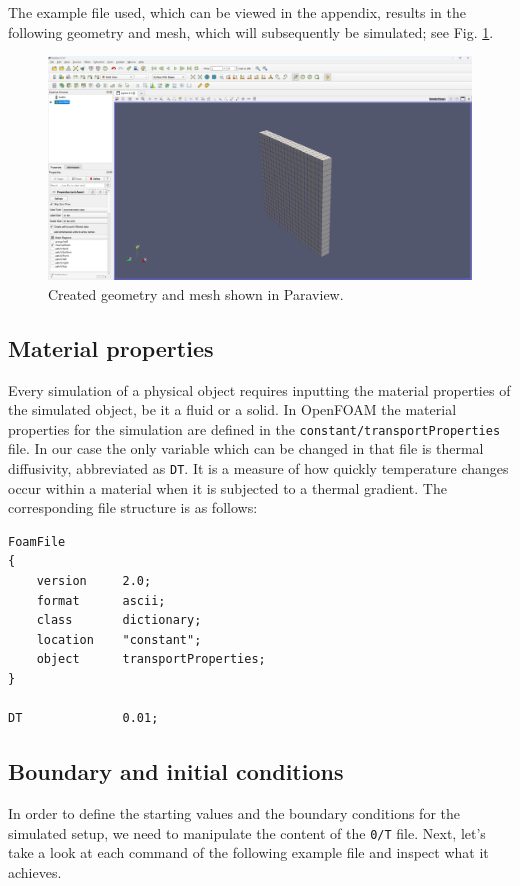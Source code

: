 \documentclass{article}
\begin{document}
\noindent The example file used, which can be viewed in the appendix, results in the following geometry and mesh, which will subsequently be simulated; see Fig. \ref{fig:UsedMesh}.

\begin{figure} [H]
    \centering
    \includegraphics[width= 15cm]{Example_geometry.png}
    \caption{Created geometry and mesh shown in Paraview.}
    \label{fig:UsedMesh}
\end{figure}

\subsection{Material properties}
Every simulation of a physical object requires inputting the material properties of the simulated object, be it a fluid or a solid. In OpenFOAM the material properties for the simulation are defined in the \texttt{constant/transportProperties} file. In our case the only variable which can be changed in that file is thermal diffusivity, abbreviated as \texttt{DT}. It is a measure of how quickly temperature changes occur within a material when it is subjected to a thermal gradient. The corresponding file structure is as follows:

\begin{verbatim}
FoamFile
{
    version     2.0;
    format      ascii;
    class       dictionary;
    location    "constant";
    object      transportProperties;
}

DT              0.01;
\end{verbatim}




\subsection{Boundary and initial conditions}
In order to define the starting values and the boundary conditions for the simulated setup, we need to manipulate the content of the \texttt{0/T} file. Next, let's take a look at each command of the following example file and inspect what it achieves.
\end{document}
